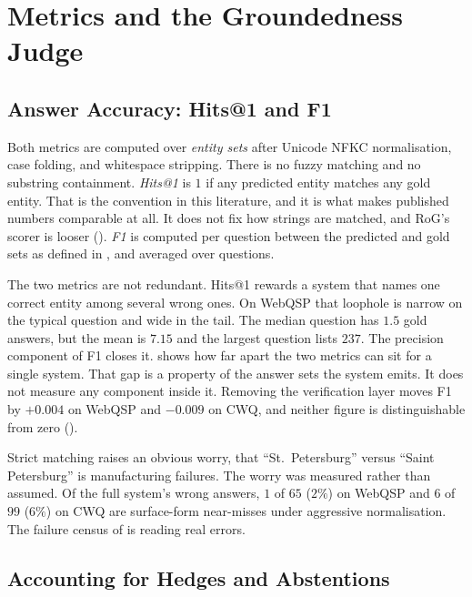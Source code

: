 \section{Metrics and the Groundedness Judge}\label{sec:metrics}

\subsection{Answer Accuracy: Hits@1 and F1}

Both metrics are computed over \emph{entity sets} after Unicode
NFKC normalisation, case folding, and
whitespace stripping. There is no fuzzy matching and no substring containment.
\emph{Hits@1} is $1$ if any predicted entity matches any gold entity. That is
the convention in this literature, and it is what makes published numbers
comparable at all. It does not fix how strings are matched, and RoG's scorer is
looser (). \emph{F1} is computed per question between
the predicted and gold sets as defined in , and averaged over
questions.

The two metrics are not redundant. Hits@1 rewards a system that names one
correct entity among several wrong ones. On WebQSP that loophole is narrow on
the typical question and wide in the tail. The median question has $1.5$ gold
answers, but the mean is $7.15$ and the largest question lists $237$. The
precision component of F1 closes it.  shows how far
apart the two metrics can sit for a single system. That gap is a property of the
answer sets the system emits. It does not measure any component inside it.
Removing the verification layer moves F1 by $+0.004$ on WebQSP and $-0.009$ on
CWQ, and neither figure is distinguishable from zero ().

Strict matching raises an obvious worry, that ``St.~Petersburg'' versus ``Saint
Petersburg'' is manufacturing failures. The worry was measured rather than
assumed. Of the full system's wrong answers, $1$ of $65$ ($2\%$) on WebQSP and
$6$ of $99$ ($6\%$) on CWQ are surface-form near-misses under aggressive
normalisation. The failure census of  is reading real
errors.

\subsection{Accounting for Hedges and Abstentions}\label{sec:hedge-accounting}

